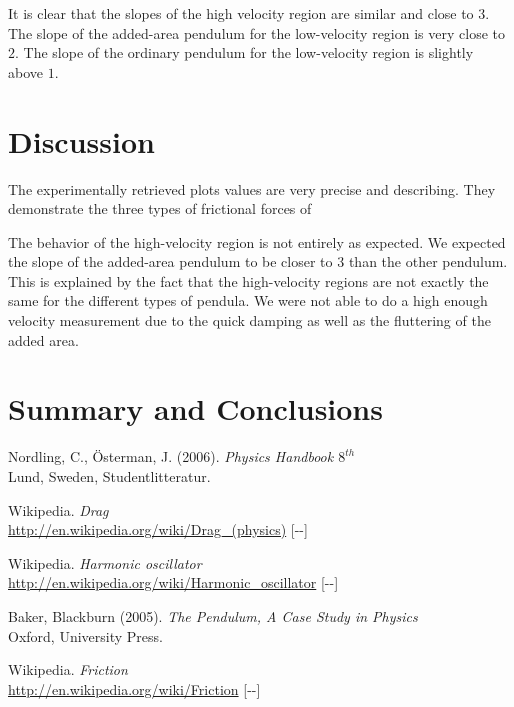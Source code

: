 \documentclass[11pt, a4paper]{article}
\newcommand{\todayswe}{\the\year-\twodigit\month-\twodigit\day}
\begin{document}
It is clear that the slopes of the high velocity region are similar and close to $3$. 
The slope of the added-area pendulum for the low-velocity region is very close to $2$.
The slope of the ordinary pendulum for the low-velocity region is slightly above $1$.



\section{Discussion}
The experimentally retrieved plots values are very precise and describing. They demonstrate the three types of frictional forces of 

The behavior of the high-velocity region is not entirely as expected. We expected the slope of the added-area pendulum 
to be closer to $3$ than the other pendulum.
This is explained by the fact that the high-velocity regions are not exactly the same for the different types of pendula. We were not 
able to do a high enough velocity measurement due to the quick damping as well as the fluttering of the added area.
\section{Summary and Conclusions}
\vfill

\begin{thebibliography}{99}
	 Nordling, C., Österman, J. (2006). 
  \textit{Physics Handbook  $8^{th}$}\\
  Lund, Sweden, Studentlitteratur.

   Wikipedia. \textit{Drag}\\ 
  \url{http://en.wikipedia.org/wiki/Drag_(physics)} [\todayswe]

   Wikipedia. \textit{Harmonic oscillator}\\ 
  \url{http://en.wikipedia.org/wiki/Harmonic_oscillator} [\todayswe]

	 Baker, Blackburn (2005). 
  \textit{The Pendulum, A Case Study in Physics}\\
  Oxford, University Press.

   Wikipedia. \textit{Friction}\\ 
  \url{http://en.wikipedia.org/wiki/Friction} [\todayswe]

\end{thebibliography}

\begin{appendix}
\end{appendix}

\end{document}
